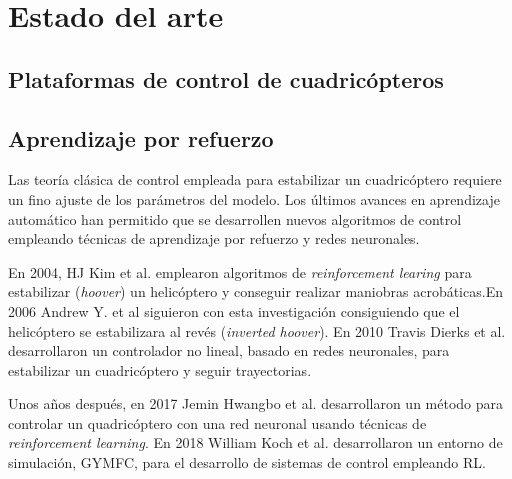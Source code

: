 \chapter{Estado del arte}


\section{Plataformas de control de cuadricópteros}

\section{Aprendizaje por refuerzo}

Las teoría clásica de control empleada para estabilizar un cuadricóptero requiere un fino ajuste de los parámetros del modelo. Los últimos avances en aprendizaje automático han permitido que se desarrollen nuevos algoritmos de control empleando técnicas de aprendizaje por refuerzo y redes neuronales.

En 2004, HJ Kim et al. \cite{kim2004autonomous} emplearon algoritmos de \textit{reinforcement learing} para estabilizar (\textit{hoover}) un helicóptero y conseguir realizar maniobras acrobáticas.En 2006 Andrew Y. et al \cite{ng2006autonomous} siguieron con esta investigación consiguiendo que el helicóptero se estabilizara al revés (\textit{inverted hoover}). En 2010 Travis Dierks et al. \cite{dierks2010output} desarrollaron un controlador no lineal, basado en redes neuronales, para estabilizar un cuadricóptero y seguir trayectorias.

Unos años después, en 2017 Jemin Hwangbo et al. \cite{hwangbo2017control} desarrollaron un método para controlar un quadricóptero con una red neuronal usando técnicas de \textit{reinforcement learning}. En 2018 William Koch et al. \cite{koch2019reinforcement} desarrollaron un entorno de simulación, GYMFC, para el desarrollo de sistemas de control empleando RL.

